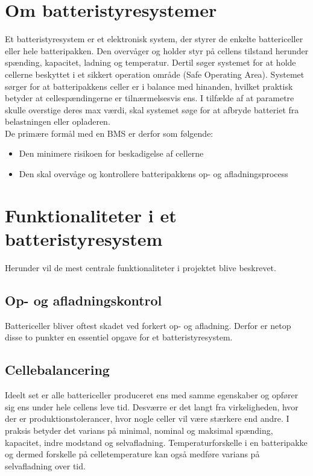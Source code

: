 \section{Om batteristyresystemer}
Et batteristyresystem er et elektronisk system, der styrer de enkelte battericeller eller hele batteripakken. Den overvåger og holder styr på cellens tilstand herunder spænding, kapacitet, ladning og temperatur. Dertil søger systemet for at holde cellerne beskyttet i et sikkert operation område (Safe Operating Area). Systemet sørger for at batteripakkens celler er i balance med hinanden, hvilket praktisk betyder at cellespændingerne er tilnærmelsesvis ens. I tilfælde af at parametre skulle overstige deres max værdi, skal systemet søge for at afbryde batteriet fra belastningen eller opladeren.
\\

De primære formål med en BMS er derfor som følgende:
\begin{itemize}[noitemsep]
	\item Den minimere risikoen for beskadigelse af cellerne
	\item Den skal overvåge og kontrollere batteripakkens op- og afladningsprocess
\end{itemize}


\section{Funktionaliteter i et batteristyresystem}
Herunder vil de mest centrale funktionaliteter i projektet blive beskrevet.

\subsection{Op- og afladningskontrol}
Battericeller bliver oftest skadet ved forkert op- og afladning. Derfor er netop disse to punkter en essentiel opgave for et batteristyresystem.

\subsection{Cellebalancering}
Ideelt set er alle battericeller produceret ens med samme egenskaber og opfører sig ens under hele cellens leve tid. Desværre er det langt fra virkeligheden, hvor der er produktionstolerancer, hvor nogle celler vil være stærkere end andre. I praksis betyder det varians på minimal, nominal og maksimal spænding, kapacitet, indre modstand og selvafladning.
Temperaturforskelle i en batteripakke og dermed forskelle på celletemperature kan også medføre varians på selvafladning over tid.
\\

